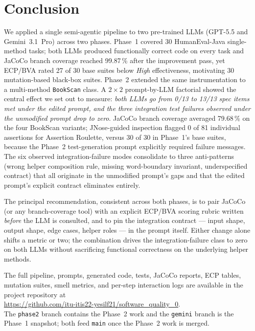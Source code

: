 \documentclass[journal]{IEEEtran}
\begin{document}
\section{Conclusion}
\label{sec:conclusion}

We applied a single semi-agentic pipeline to two pre-trained
LLMs (GPT-5.5 and Gemini~3.1~Pro) across two phases. Phase~1
covered 30 HumanEval-Java single-method tasks; both LLMs
produced functionally correct code on every task and JaCoCo
branch coverage reached 99.87\,\% after the improvement pass,
yet ECP/BVA rated 27 of 30 base suites below \emph{High}
effectiveness, motivating 30 mutation-based black-box suites.
Phase~2 extended the same instrumentation to a multi-method
\texttt{BookScan} class. A $2 \times 2$ prompt-by-LLM factorial
showed the central effect we set out to measure:
\emph{both LLMs go from 0/13 to 13/13 spec items met under the
edited prompt, and the three integration test failures observed
under the unmodified prompt drop to zero}. JaCoCo branch
coverage averaged 79.68\,\% on the four BookScan variants;
JNose-guided inspection flagged 0 of 81 individual assertions
for Assertion Roulette, versus 30 of 30 in Phase~1's base
suites, because the Phase~2 test-generation prompt explicitly
required failure messages. The six observed integration-failure
modes consolidate to three anti-patterns (wrong helper
composition rule, missing word-boundary invariant,
underspecified contract) that all originate in the unmodified
prompt's gaps and that the edited prompt's explicit contract
eliminates entirely.

The principal recommendation, consistent across both phases, is
to pair JaCoCo (or any branch-coverage tool) with an explicit
ECP/BVA scoring rubric written \emph{before} the LLM is
consulted, and to pin the integration contract --- input shape,
output shape, edge cases, helper roles --- in the prompt
itself. Either change alone shifts a metric or two; the
combination drives the integration-failure class to zero on
both LLMs without sacrificing functional correctness on the
underlying helper methods.

The full pipeline, prompts, generated code, tests, JaCoCo
reports, ECP tables, mutation suites, smell metrics, and
per-step interaction logs are available in the project
repository at\\
\url{https://github.com/itu-itis22-yesilf21/software_quality_0}.\\
The \texttt{phase2} branch contains the Phase~2 work and the
\texttt{gemini} branch is the Phase~1 snapshot; both feed
\texttt{main} once the Phase~2 work is merged.
\end{document}

